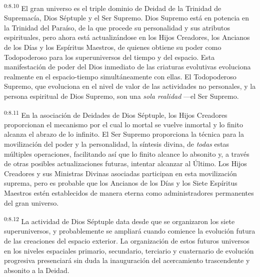 \par
\textsuperscript{0:8.10} El gran universo es el triple dominio de Deidad de la Trinidad de Supremacía, Dios Séptuple y el Ser Supremo. Dios Supremo está en potencia en la Trinidad del Paraíso, de la que procede su personalidad y sus atributos espirituales, pero ahora está actualizándose en los Hijos Creadores, los Ancianos de los Días y los Espíritus Maestros, de quienes obtiene su poder como Todopoderoso para los superuniversos del tiempo y del espacio. Esta manifestación de poder del Dios inmediato de las criaturas evolutivas evoluciona realmente en el espacio-tiempo simultáneamente con ellas. El Todopoderoso Supremo, que evoluciona en el nivel de valor de las actividades no personales, y la persona espiritual de Dios Supremo, son una \textit{sola realidad} ---el Ser Supremo.

\par
\textsuperscript{0:8.11} En la asociación de Deidades de Dios Séptuple, los Hijos Creadores proporcionan el mecanismo por el cual lo mortal se vuelve inmortal y lo finito alcanza el abrazo de lo infinito. El Ser Supremo proporciona la técnica para la movilización del poder y la personalidad, la síntesis divina, de \textit{todas} estas múltiples operaciones, facilitando así que lo finito alcance lo absonito y, a través de otras posibles actualizaciones futuras, intentar alcanzar al Último. Los Hijos Creadores y sus Ministras Divinas asociadas participan en esta movilización suprema, pero es probable que los Ancianos de los Días y los Siete Espíritus Maestros estén establecidos de manera eterna como administradores permanentes del gran universo.

\par
\textsuperscript{0:8.12} La actividad de Dios Séptuple data desde que se organizaron los siete superuniversos, y probablemente se ampliará cuando comience la evolución futura de las creaciones del espacio exterior. La organización de estos futuros universos en los niveles espaciales primario, secundario, terciario y cuaternario de evolución progresiva presenciará sin duda la inauguración del acercamiento trascendente y absonito a la Deidad.

